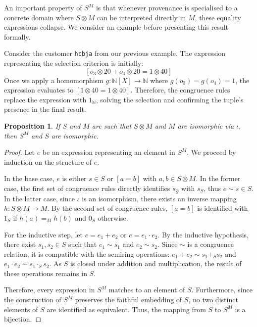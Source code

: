 \documentclass[oneside, 11pt]{amsbook}
\theoremstyle{plain}
\newtheorem{prop}[thm]{Proposition}
\theoremstyle{definition}
\theoremstyle{remark}
\begin{document}
An important property of $S^M$ is that whenever provenance is specialised to a concrete domain where $S \otimes M$ can be interpreted directly in $M$, these equality expressions collapse. We consider an example before presenting this result formally.

\begin{exmpl}
    Consider the customer \texttt{hcbja} from our previous example. The expression representing the selection criterion is initially:
    \[
        [o_3 \otimes 20 + o_4 \otimes 20 = 1 \otimes 40]
    \]
    Once we apply a homomorphism $g: \mathbb{N}[X] \to \mathbb{N}$ where $g(o_3) = g(o_4) = 1$, the expression evaluates to $[1 \otimes 40 = 1 \otimes 40]$. Therefore, the congruence rules replace the expression with $1_{\mathbb{N}}$, solving the selection and confirming the tuple's presence in the final result.
\end{exmpl}

\begin{prop}
    \label{smisomoprhic}
    If $S$ and $M$ are such that $S \otimes M$ and $M$ are isomorphic via $\iota$, then $S^M$ and $S$ are isomorphic.
\end{prop}
\begin{proof}
    Let $e$ be an expression representing an element in $S^M$. We proceed by induction on the structure of $e$.

    In the base case, $e$ is either $s \in S$ or $[a = b]$ with $a, b \in S \otimes M$. In the former case, the first set of congruence rules directly identifies $s_{\widehat{S}}$ with $s_S$, thus $e \sim s \in S$. In the latter case, since $\iota$ is an isomorphism, there exists an inverse mapping $h: S \otimes M \to M$. By the second set of congruence rules, $[a = b]$ is identified with $1_S$ if $h(a) =_M h(b)$ and $0_S$ otherwise.

    For the inductive step, let $e = e_1 + e_2$ or $e = e_1 \cdot e_2$. By the inductive hypothesis, there exist $s_1, s_2 \in S$ such that $e_1 \sim s_1$ and $e_2 \sim s_2$. Since $\sim$ is a congruence relation, it is compatible with the semiring operations: $e_1 + e_2 \sim s_1 +_S s_2$ and $e_1 \cdot e_2 \sim s_1 \cdot_S s_2$. As $S$ is closed under addition and multiplication, the result of these operations remains in $S$.

    Therefore, every expression in $S^M$ matches to an element of $S$. Furthermore, since the construction of $S^M$ preserves the faithful embedding of $S$, no two distinct elements of $S$ are identified as equivalent. Thus, the mapping from $S$ to $S^M$ is a bijection.
\end{proof}
\end{document}
